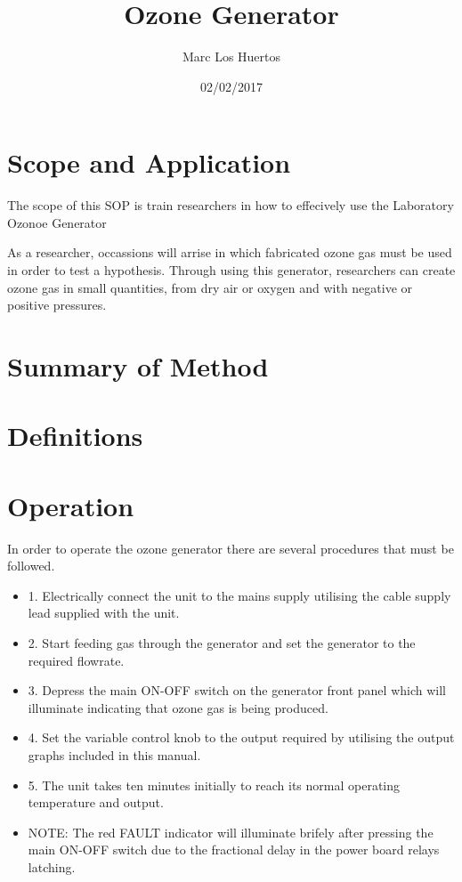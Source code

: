 \documentclass[12pt]{../SOP2}
\title{Ozone Generator}
\date{02/02/2017}
\author{Marc Los Huertos}
\begin{document}


\maketitle

\section{Scope and Application}

\NP The scope of this SOP is train researchers in how to effecively use the Laboratory Ozonoe Generator 

\NP As a researcher, occassions will arrise in which fabricated ozone gas must be used in order to test a hypothesis. Through using this generator, researchers can create ozone gas in small quantities, from dry air or oxygen and with negative or positive pressures. 

\section{Summary of Method}

\section{Definitions}

\section{Operation}


\NP In order to operate the ozone generator there are several procedures that must be followed.

\begin{itemize}
  \item 1. Electrically connect the unit to the mains supply utilising the cable supply lead supplied with the unit.
  \item 2. Start feeding gas through the generator and set the generator to the required flowrate.
  \item 3. Depress the main ON-OFF switch on the generator front panel which will illuminate indicating that ozone gas is being produced.
  \item 4. Set the variable control knob to the output required by utilising the output graphs included in this manual.
  \item 5. The unit takes ten minutes initially to reach its normal operating temperature and output. 
  \item NOTE: The red FAULT indicator will illuminate brifely after pressing the main ON-OFF switch due to the fractional delay in the power board relays latching.
\end{itemize}
\end{document}
